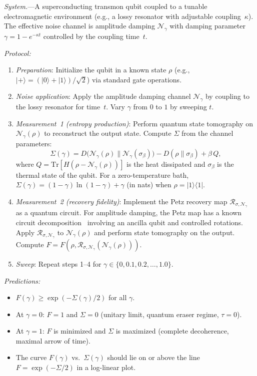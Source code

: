 \documentclass[prl,twocolumn,superscriptaddress,longbibliography]{revtex4-2}
\newcommand{\Tr}{\mathrm{Tr}}
\newcommand{\Petz}{\mathcal{R}}
\newcommand{\chan}{\mathcal{N}}
\newcommand{\ket}[1]{|#1\rangle}
\newcommand{\bra}[1]{\langle#1|}
\newcommand{\tauasym}{\tau}
\begin{document}
\emph{System.}---A superconducting transmon qubit coupled to a tunable
electromagnetic environment (e.g., a lossy resonator with adjustable
coupling~$\kappa$). The effective noise channel is amplitude damping
$\chan_\gamma$ with damping parameter
$\gamma = 1 - e^{-\kappa t}$ controlled by the coupling time~$t$.

\emph{Protocol:}
\begin{enumerate}
\item \emph{Preparation}: Initialize the qubit in a known state
  $\rho$ (e.g., $\ket{+} = (\ket{0}+\ket{1})/\sqrt{2}$) via
  standard gate operations.
\item \emph{Noise application}: Apply the amplitude damping channel
  $\chan_\gamma$ by coupling to the lossy resonator for time~$t$.
  Vary $\gamma$ from $0$ to $1$ by sweeping $t$.
\item \emph{Measurement~1 (entropy production)}: Perform quantum state
  tomography on $\chan_\gamma(\rho)$ to reconstruct the output state.
  Compute $\Sigma$ from the channel parameters:
  \begin{equation}
  \Sigma(\gamma) = D\!\big(\chan_\gamma(\rho)\big\|\chan_\gamma(\sigma_\beta)\big)
  - D(\rho\|\sigma_\beta) + \beta\, Q,
  \end{equation}
  where $Q = \Tr[H(\rho - \chan_\gamma(\rho))]$ is the heat
  dissipated and $\sigma_\beta$ is the thermal state of the qubit.
  For a zero-temperature bath, $\Sigma(\gamma) = (1-\gamma)\ln(1-\gamma)
  + \gamma$ (in nats) when $\rho = \ket{1}\bra{1}$.
\item \emph{Measurement~2 (recovery fidelity)}: Implement the Petz
  recovery map $\Petz_{\sigma,\chan_\gamma}$ as a quantum circuit.
  For amplitude damping, the Petz map has a known circuit
  decomposition~\cite{Barnum2002} involving an ancilla qubit
  and controlled rotations. Apply $\Petz_{\sigma,\chan_\gamma}$ to
  $\chan_\gamma(\rho)$ and perform state tomography on the output.
  Compute $F = F(\rho, \Petz_{\sigma,\chan_\gamma}(\chan_\gamma(\rho)))$.
\item \emph{Sweep}: Repeat steps 1--4 for $\gamma \in \{0, 0.1, 0.2,
  \ldots, 1.0\}$.
\end{enumerate}

\emph{Predictions:}
\begin{itemize}
\item $F(\gamma) \geq \exp(-\Sigma(\gamma)/2)$ for all $\gamma$.
\item At $\gamma = 0$: $F = 1$ and $\Sigma = 0$ (unitary limit,
  quantum eraser regime, $\tauasym = 0$).
\item At $\gamma = 1$: $F$ is minimized and $\Sigma$ is maximized
  (complete decoherence, maximal arrow of time).
\item The curve $F(\gamma)$ vs.\ $\Sigma(\gamma)$ should lie on or
  above the line $F = \exp(-\Sigma/2)$ in a log-linear plot.
\end{itemize}
\end{document}
